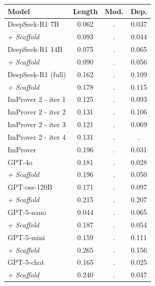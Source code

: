 \begin{tabular}{l|ccc}
\hline
\textbf{Model}  & \textbf{Length} & \textbf{Mod.} & \textbf{Dep.} \\
\hline
DeepSeek-R1 7B & 0.062 & . & 0.037 \\
\textit{+ Scaffold} & 0.093 & . & 0.044 \\
DeepSeek-R1 14B & 0.075 & . & 0.065 \\
\textit{+ Scaffold} & 0.090 & . & 0.056 \\
DeepSeek-R1 (full) & 0.162 & . & 0.109 \\
\textit{+ Scaffold} & 0.178 & . & 0.115 \\
\hdashline
ImProver 2 - iter 1 & 0.125 & . & 0.093 \\
ImProver 2 - iter 2 & 0.131 & . & 0.106 \\
ImProver 2 - iter 3 & 0.121 & . & 0.069 \\
ImProver 2 - iter 4 & 0.131 & . & . \\
\hdashline
ImProver & 0.196 & . & 0.031 \\
GPT-4o & 0.181 & . & 0.028 \\
\textit{+ Scaffold} & 0.196 & . & 0.050 \\
\hdashline
GPT-oss-120B & 0.171 & . & 0.097 \\
\textit{+ Scaffold} & 0.215 & . & 0.207 \\
GPT-5-nano & 0.044 & . & 0.065 \\
\textit{+ Scaffold} & 0.187 & . & 0.054 \\
GPT-5-mini & 0.159 & . & 0.111 \\
\textit{+ Scaffold} & 0.265 & . & 0.156 \\
GPT-5-chat & 0.165 & . & 0.025 \\
\textit{+ Scaffold} & 0.240 & . & 0.047 \\
\hline
\end{tabular}
